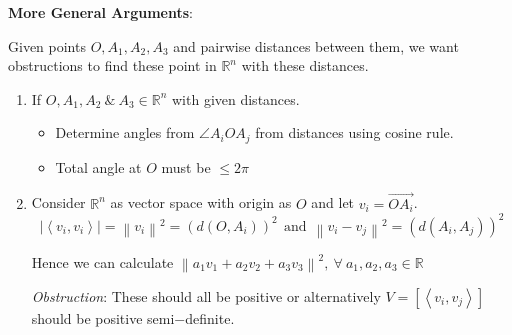 \noindent \textbf{More General Arguments}:

\vspace{0.1in}

Given points $O, A_1, A_2, A_3$ and pairwise distances between them, we want
obstructions to find these point in $\mathbb{R}^n$ with these distances.

\begin{enumerate}
    \item If $O, A_1, A_2\ \&\ A_3 \in \mathbb{R}^n$ with given distances.
    \begin{itemize}
        \item Determine angles from $\angle A_i O A_j$ from distances using cosine rule.
        \item Total angle at $O$ must be $\leq 2\pi$
    \end{itemize}

    \item Consider $\mathbb{R}^n$ as vector space with origin as $O$ and let
    $v_i = \overrightarrow{OA_i}$.
    $$\left | \left \langle v_i, v_i \right \rangle \right | = \left \| v_i
    \right \| ^2 = (d(O, A_i))^2 \ \ \text{and} \ \ \left \| v_i - v_j \right \|^2 = (d(A_i, A_j))^2 $$

    Hence we can calculate $\left \| a_1v_1 + a_2v_2 + a_3v_3 \right \|^2, \
    \forall\ a_1, a_2, a_3 \in \mathbb{R} $

    \textit{Obstruction}: These should all be positive or alternatively
    $V = [\left \langle v_i, v_j \right \rangle]$ should be positive semi$-$definite.

\end{enumerate}
